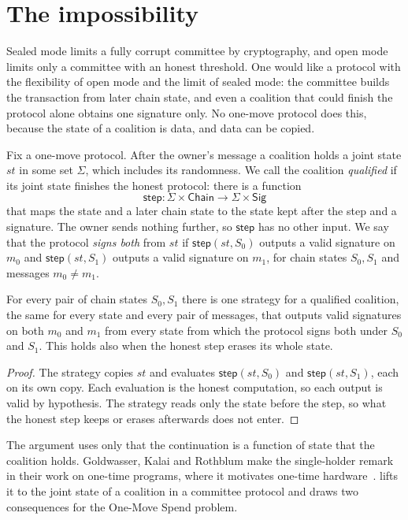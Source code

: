 \section{The impossibility}\label{sec:impossibility}

Sealed mode limits a fully corrupt committee by cryptography, and open mode limits only a committee with an honest threshold. One would like a protocol with the flexibility of open mode and the limit of sealed mode: the committee builds the transaction from later chain state, and even a coalition that could finish the protocol alone obtains one signature only. No one-move protocol does this, because the state of a coalition is data, and data can be copied.

Fix a one-move protocol. After the owner's message a coalition holds a joint state $st$ in some set $\Sigma$, which includes its randomness. We call the coalition \emph{qualified} if its joint state finishes the honest protocol: there is a function
\[
  \mathsf{step} : \Sigma \times \mathsf{Chain} \to \Sigma \times \mathsf{Sig}
\]
that maps the state and a later chain state to the state kept after the step and a signature. The owner sends nothing further, so $\mathsf{step}$ has no other input. We say that the protocol \emph{signs both} from $st$ if $\mathsf{step}(st, S_0)$ outputs a valid signature on $m_0$ and $\mathsf{step}(st, S_1)$ outputs a valid signature on $m_1$, for chain states $S_0, S_1$ and messages $m_0 \neq m_1$.

\begin{theorem}\label{thm:imposs}
For every pair of chain states $S_0, S_1$ there is one strategy for a qualified coalition, the same for every state and every pair of messages, that outputs valid signatures on both $m_0$ and $m_1$ from every state from which the protocol signs both under $S_0$ and $S_1$. This holds also when the honest step erases its whole state.
\end{theorem}

\begin{proof}
The strategy copies $st$ and evaluates $\mathsf{step}(st, S_0)$ and $\mathsf{step}(st, S_1)$, each on its own copy. Each evaluation is the honest computation, so each output is valid by hypothesis. The strategy reads only the state before the step, so what the honest step keeps or erases afterwards does not enter.
\end{proof}

The argument uses only that the continuation is a function of state that the coalition holds. Goldwasser, Kalai and Rothblum make the single-holder remark in their work on one-time programs, where it motivates one-time hardware~\cite{GKR08}.  lifts it to the joint state of a coalition in a committee protocol and draws two consequences for the One-Move Spend problem.

